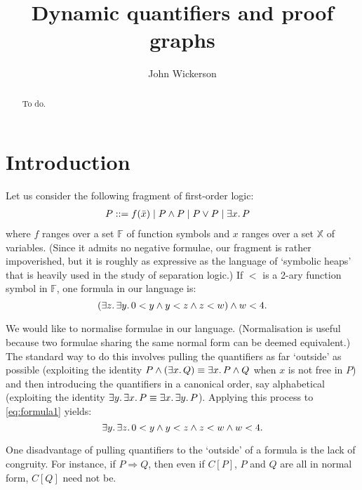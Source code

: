 \documentclass[a4paper]{llncs}
\title{Dynamic quantifiers and proof graphs}
\author{John Wickerson}
\institute{Imperial College London}
\begin{document}
\maketitle


\pagestyle{plain}

\begin{abstract} 
To do.
\end{abstract}

\section{Introduction}

Let us consider the following fragment of first-order logic:
\begin{align*}
P &::= f(\bar x) \mid P \wedge P \mid P \vee P \mid \exists x \ldotp P
\end{align*}
where $f$ ranges over a set $\mathbb F$ of function symbols and $x$
ranges over a set $\mathbb X$ of variables. (Since it admits no
negative formulae, our fragment is rather impoverished, but it is
roughly as expressive as the language of `symbolic heaps' that is
heavily used in the study of separation logic.) If $<$ is
a 2-ary function symbol in $\mathbb F$, one formula in our
language is:
\begin{equation}
(\exists z\ldotp \exists y\ldotp 0 < y \wedge y < z \wedge z < w)
\wedge w < 4. \label{eq:formula1}
\end{equation}

We would like to normalise formulae in our language. (Normalisation is
useful because two formulae sharing the same normal form can be deemed
equivalent.) The standard way to do this involves pulling the
quantifiers as far `outside' as possible (exploiting the identity
$P\wedge (\exists x\ldotp Q) \equiv \exists x \ldotp P \wedge Q$ when
$x$ is not free in $P$) and then introducing the quantifiers in a
canonical order, say alphabetical (exploiting the identity $\exists y
\ldotp \exists x\ldotp P \equiv \exists x\ldotp\exists y \ldotp
P$). Applying this process to \eqref{eq:formula1} yields:
\begin{equation}
\exists y\ldotp \exists z\ldotp 0 < y \wedge y < z \wedge z < w
\wedge w < 4. \label{eq:formula2}
\end{equation}

One disadvantage of pulling quantifiers to the `outside' of a formula
is the lack of congruity. For instance, if $P \Rightarrow Q$, then
even if $C[P]$, $P$ and $Q$ are all in normal form, $C[Q]$ need not be.












\end{document}
